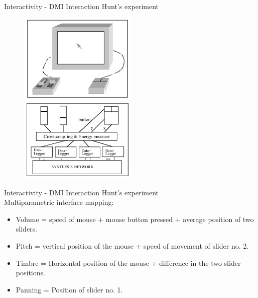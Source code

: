 \documentclass{beamer}
\begin{document}
\begin{frame}{Interactivity - DMI Interaction} 
    Hunt's experiment\\
    \vspace{5mm}
    \begin{figure}[h]
        \includegraphics[width=0.5\textwidth]{hunt2000_interfaceC.png}
        \includegraphics[width=0.5\textwidth]{hunt2000_mapping_c.png}
    \end{figure}
\end{frame}

\begin{frame}{Interactivity - DMI Interaction} 
    Hunt's experiment\\
    \vspace{5mm}
    Multiparametric interface mapping:
    \begin{itemize}
        \item Volume = speed of mouse + mouse button pressed + average position of two sliders.
        \item Pitch = vertical position of the mouse + speed of movement of slider no. 2.
        \item Timbre = Horizontal position of the mouse + difference in the two slider positions. 
        \item Panning = Position of slider no. 1.
    \end{itemize}
\end{frame}
\end{document}
